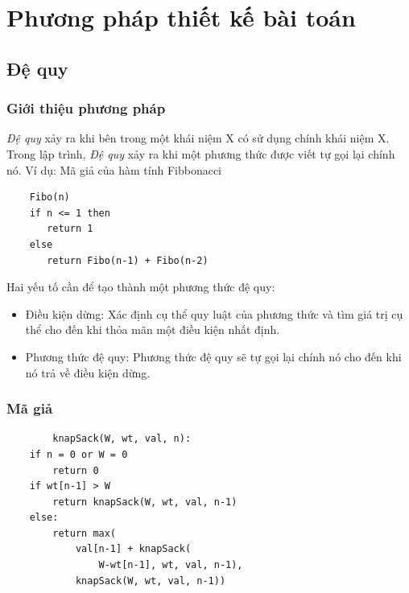 \documentclass[12pt,a4paper]{report}
\begin{document}
    \chapter{Phương pháp thiết kế bài toán}
    \section{Đệ quy}
    \subsection{Giới thiệu phương pháp}
    \textit{Đệ quy} xảy ra khi bên trong một khái niệm X có sử dụng chính khái 
    niệm X. Trong lập trình, \textit{Đệ quy} xảy ra khi một phương thức được viết
    tự gọi lại chính nó.
    Ví dụ: Mã giả của hàm tính Fibbonacci
    \begin{lstlisting}
    Fibo(n)
    if n <= 1 then
       return 1
    else
       return Fibo(n-1) + Fibo(n-2)
    \end{lstlisting}
    Hai yếu tố cần để tạo thành một phương thức đệ quy:
    \begin{itemize}
        \item Điều kiện dừng: Xác định cụ thể quy luật của phương thức và tìm giá 
    trị cụ thể cho đến khi thỏa mãn một điều kiện nhất định.
        \item Phương thức đệ quy: Phương thức đệ quy sẽ tự gọi lại chính nó cho đến khi
    nó trả về điều kiện dừng.
    \end{itemize}

    \subsection{Mã giả}
    \begin{lstlisting}
        knapSack(W, wt, val, n): 
    if n = 0 or W = 0  
        return 0
    if wt[n-1] > W
        return knapSack(W, wt, val, n-1) 
    else: 
        return max( 
            val[n-1] + knapSack( 
                W-wt[n-1], wt, val, n-1), 
            knapSack(W, wt, val, n-1)) 
    \end{lstlisting}
\end{document}
